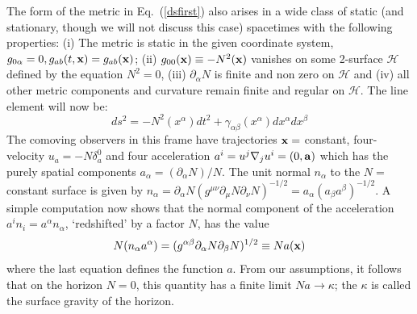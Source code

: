 \documentclass[12pt]{iopart}
\def\eq#1{{Eq.~(\ref{#1})}}
\begin{document}
The form of the metric in \eq{dsfirst} also arises in a wide class of static (and stationary, though we will not discuss this case) spacetimes with the following properties:
(i) The metric is static  in the given coordinate system, $g_{0\alpha} =0, g_{ab} (t,{\bf x}) = g_{ab}({\bf x})$;
   (ii) $g_{00}({\bf x}) \equiv -N^2({\bf x})$ vanishes on some 2-surface $\mathcal{H}$ defined
   by the equation $N^2 =0$, (iii) $\partial_\alpha N$ is finite and non zero on $\mathcal{H}$
   and (iv) all other metric components and curvature
   remain finite and regular on $\mathcal{H}$.  
 The line element will now be:
 \begin{equation}
   ds^2=-N^2 (x^\alpha)  dt^2 +  \gamma_{\alpha\beta} (x^\alpha) dx^\alpha dx^\beta
   \label{startmetric}
   \end{equation}
The comoving observers in this frame have trajectories ${\bf x}=$
    constant, four-velocity $u_a=-N\delta^0_a$ and four acceleration $a^i=
    u^j\nabla_ju^i=(0,{\bf a})$ which has the purely
    spatial components $a_\alpha=(\partial_\alpha N)/N$.
 The unit normal $n_\alpha$ to the $N=$ constant surface is given by
    $n_\alpha =\partial_\alpha N (g^{\mu\nu}\partial_\mu N  \partial_\nu N)^{-1/2} =
    a_\alpha (a_\beta a^\beta)^{-1/2}$. A simple computation now shows that 
    the normal component of the acceleration $a^i n_i = a^\alpha n_\alpha$, `redshifted'
    by a factor $N$, has the value
\begin{equation}
    N(n_\alpha a^\alpha) = ( g^{\alpha\beta} \partial_\alpha N \partial_\beta N)^{1/2}\equiv Na({\bf x})
\label{defkappa}
\end{equation}
where the last equation defines the function $a$. From our assumptions, it follows that on the horizon $N=0$,
this quantity has a finite limit $Na\to \kappa$; the $\kappa$ is called the surface gravity of the horizon.
\end{document}
